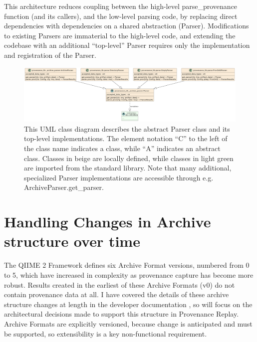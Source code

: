 This architecture reduces coupling between the high-level parse\_provenance
function (and its callers), and the low-level parsing code, by replacing direct
dependencies with dependencies on a shared abstraction (Parser). Modifications
to existing Parsers are immaterial to the high-level code, and extending the
codebase with an additional “top-level” Parser requires only the implementation
and registration of the Parser. 

\begin{figure}[htp]
\centering
\includegraphics[width=\textwidth]{figures/allParsersUML.png}
\caption[UML Class diagram of the abstract Parser class and its implementations]%
{This UML class diagram describes the abstract Parser class and its top-level
implementations. The element notation “C” to the left of the class name
indicates a class, while “A” indicates an abstract class. Classes in beige are
locally defined, while classes in light green are imported from the standard
library. Note that many additional, specialized Parser implementations are
accessible through e.g. ArchiveParser.get\_parser.}
\label{fig:allParsersUML}
\end{figure}


\section{Handling Changes in Archive structure over time}

The QIIME 2 Framework defines six Archive Format versions, numbered from 0 to 5,
which have increased in complexity as provenance capture has become more robust.
Results created in the earliest of these Archive Formats (v0) do not contain
provenance data at all. I have covered the details of these archive structure
changes at length in the developer documentation \parencite{qiime_2_development_team_archive_2018},
so will focus on the architectural decisions made to support this structure in
Provenance Replay.  Archive Formats are explicitly versioned, because change is
anticipated and must be supported, so extensibility is a key non-functional
requirement.

